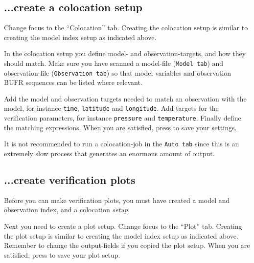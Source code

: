 \documentclass[letterpaper,10pt,twoside,twocolumn,openany]{book}
\begin{document}
{\subsection{...create a colocation setup}
Change focus to the ``Colocation'' tab. 
Creating the colocation setup is similar to creating the model index setup as indicated above.

In the colocation setup you define model- and observation-targets, and how they should match.
Make sure you have scanned a model-file (\lstinline!Model tab!)
and observation-file  (\lstinline!Observation tab!)
so that model variables and observation BUFR sequences can be listed where relevant.

Add the model and observation targets needed to match an observation with the model, for instance
\lstinline!time!, \lstinline!latitude! and \lstinline!longitude!.
Add targets for the verification parameters, for instance \lstinline!pressure! and \lstinline!temperature!. Finally define the matching expressions.
When you are satisfied, press  to save your settings.

It is not recommended to run a colocation-job in the \lstinline!Auto tab! since this is an extremely slow process that generates an enormous amount of output.

\subsection{...create verification plots}
Before you can make verification plots, you must have
created a model and observation index, and a colocation {\em setup}.

Next you need to create a plot setup. Change focus to the ``Plot'' tab. 
Creating the plot setup is similar to creating the model index setup as indicated above. Remember to change the output-fields if you copied the plot setup.
When you are satisfied, press  to save your plot setup.

}
\end{document}
